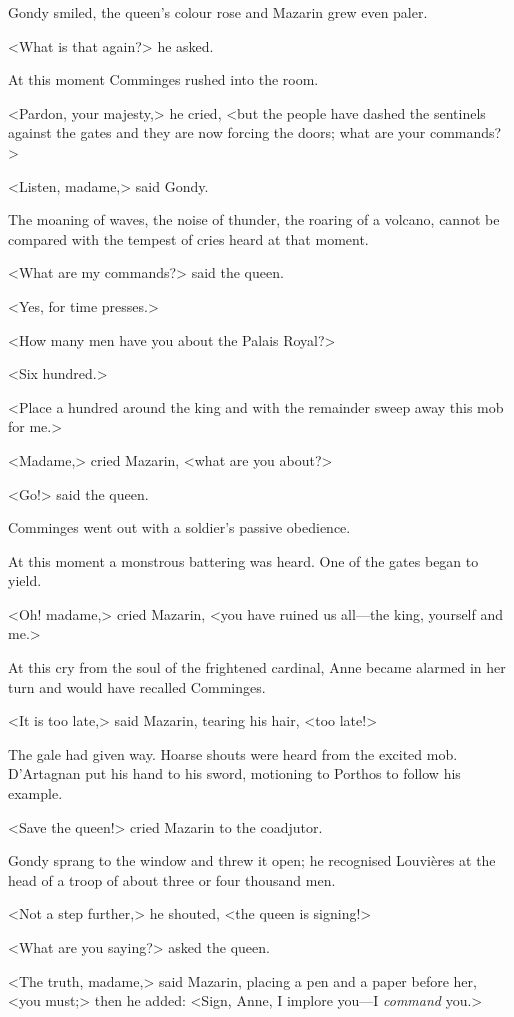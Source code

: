 Gondy smiled, the queen's colour rose and Mazarin grew even paler.

<What is that again?> he asked.

At this moment Comminges rushed into the room.

<Pardon, your majesty,> he cried, <but the people have dashed the sentinels against the gates and they are now forcing the doors; what are your commands?>

<Listen, madame,> said Gondy.

The moaning of waves, the noise of thunder, the roaring of a volcano, cannot be compared with the tempest of cries heard at that moment.

<What are my commands?> said the queen.

<Yes, for time presses.>

<How many men have you about the Palais Royal?>

<Six hundred.>

<Place a hundred around the king and with the remainder sweep away this mob for me.>

<Madame,> cried Mazarin, <what are you about?>

<Go!> said the queen.

Comminges went out with a soldier's passive obedience.

At this moment a monstrous battering was heard. One of the gates began to yield.

<Oh! madame,> cried Mazarin, <you have ruined us all—the king, yourself and me.>

At this cry from the soul of the frightened cardinal, Anne became alarmed in her turn and would have recalled Comminges.

<It is too late,> said Mazarin, tearing his hair, <too late!>

The gale had given way. Hoarse shouts were heard from the excited mob. D'Artagnan put his hand to his sword, motioning to Porthos to follow his example.

<Save the queen!> cried Mazarin to the coadjutor.

Gondy sprang to the window and threw it open; he recognised Louvières at the head of a troop of about three or four thousand men.

<Not a step further,> he shouted, <the queen is signing!>

<What are you saying?> asked the queen.

<The truth, madame,> said Mazarin, placing a pen and a paper before her, <you must;> then he added: <Sign, Anne, I implore you—I \textit{command} you.>

